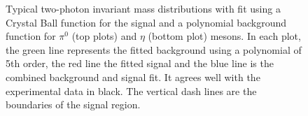 \documentclass[aps,prX,preprint,groupedaddress,linenumbers]{revtex4-1}
\begin{document}
\begin{figure}
  \centering     
  \caption{Typical two-photon invariant mass distributions with fit using a Crystal Ball function for the signal and a polynomial background function for $\pi^0$ (top plots) and $\eta$ (bottom plot) mesons. In each plot, the green line represents the fitted background using a polynomial of 5th order, the red line the fitted signal and the blue line is the combined background and signal fit. It agrees well with the experimental data in black. The vertical dash lines are the boundaries of the signal region.}
  \label{fig:crystalfit}
\end{figure}
\end{document}

